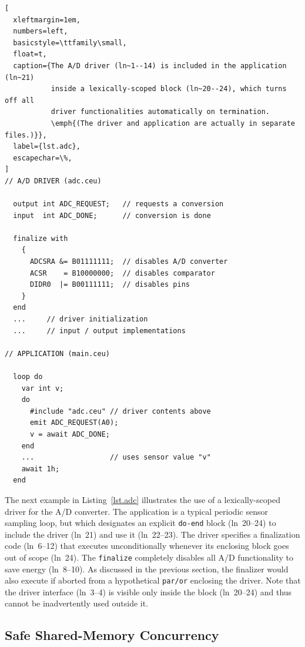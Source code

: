\documentclass[sigplan,10pt,review,anonymous]{acmart}\settopmatter{printfolios=true,printccs=false,printacmref=false}
\newcommand{\code}[1] {{\small{\texttt{#1}}}}
\begin{document}
\begin{lstlisting}[
  xleftmargin=1em,
  numbers=left,
  basicstyle=\ttfamily\small,
  float=t,
  caption={The A/D driver (ln~1--14) is included in the application (ln~21)
           inside a lexically-scoped block (ln~20--24), which turns off all
           driver functionalities automatically on termination.
           \emph{(The driver and application are actually in separate files.)}},
  label={lst.adc},
  escapechar=\%,
]
// A/D DRIVER (adc.ceu)

  output int ADC_REQUEST;   // requests a conversion
  input  int ADC_DONE;      // conversion is done

  finalize with
    {
      ADCSRA &= B01111111;  // disables A/D converter
      ACSR    = B10000000;  // disables comparator
      DIDR0  |= B00111111;  // disables pins
    }
  end
  ...     // driver initialization
  ...     // input / output implementations

// APPLICATION (main.ceu)

  loop do
    var int v;
    do
      #include "adc.ceu" // driver contents above
      emit ADC_REQUEST(A0);
      v = await ADC_DONE;
    end
    ...                  // uses sensor value "v"
    await 1h;
  end
\end{lstlisting}

The next example in Listing~\ref{lst.adc} illustrates the use of a
lexically-scoped driver for the A/D converter.
%
The application is a typical periodic sensor sampling loop, but which
designates an explicit \code{do-end} block (ln~20--24) to include the driver
(ln~21) and use it (ln~22--23).
%
The driver specifies a finalization code (ln~6--12) that executes
unconditionally whenever its enclosing block goes out of scope (ln~24).
The \code{finalize} completely disables all A/D functionality to save energy
(ln~8--10).
%
As discussed in the previous section, the finalizer would also execute if
aborted from a hypothetical \code{par/or} enclosing the driver.
%
Note that the driver interface (ln~3--4) is visible only inside the block
(ln~20--24) and thus cannot be inadvertently used outside it.

\subsection{Safe Shared-Memory Concurrency}
\label{sec.shared}
\end{document}
